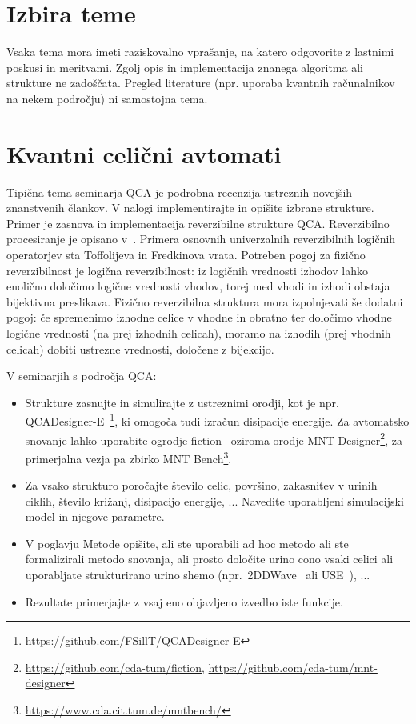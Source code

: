 \section*{Izbira teme}

Vsaka tema mora imeti raziskovalno vprašanje, na katero odgovorite z lastnimi poskusi in meritvami. Zgolj opis in implementacija znanega algoritma ali strukture ne zadoščata. Pregled literature (npr. uporaba kvantnih računalnikov na nekem področju) ni samostojna tema.

\section*{Kvantni celični avtomati}
\label{g00:sec:qca}

Tipična tema seminarja QCA je podrobna recenzija ustreznih novejših znanstvenih člankov. V nalogi implementirajte in opišite izbrane strukture. Primer je zasnova in implementacija reverzibilne strukture QCA. Reverzibilno procesiranje je opisano v~\cite{landauer1961, bennett1973, toffoli1980, frank2017}. Primera osnovnih univerzalnih reverzibilnih logičnih operatorjev sta Toffolijeva in Fredkinova vrata. Potreben pogoj za fizično reverzibilnost je logična reverzibilnost: iz logičnih vrednosti izhodov lahko enolično določimo logične vrednosti vhodov, torej med vhodi in izhodi obstaja bijektivna preslikava. Fizično reverzibilna struktura mora izpolnjevati še dodatni pogoj: če spremenimo izhodne celice v vhodne in obratno ter določimo vhodne logične vrednosti (na prej izhodnih celicah), moramo na izhodih (prej vhodnih celicah) dobiti ustrezne vrednosti, določene z bijekcijo.

V seminarjih s področja QCA:
\begin{itemize}
\item Strukture zasnujte in simulirajte z ustreznimi orodji, kot je npr. QCADesigner-E~\cite{walus2004, silltorres2018}\footnote{\url{https://github.com/FSillT/QCADesigner-E}}, ki omogoča tudi izračun disipacije energije. Za avtomatsko snovanje lahko uporabite ogrodje fiction~\cite{walter2019fiction} oziroma orodje MNT Designer\footnote{\url{https://github.com/cda-tum/fiction}, \url{https://github.com/cda-tum/mnt-designer}}, za primerjalna vezja pa zbirko MNT Bench\footnote{\url{https://www.cda.cit.tum.de/mntbench/}}.
\item Za vsako strukturo poročajte število celic, površino, zakasnitev v urinih ciklih, število križanj, disipacijo energije, ... Navedite uporabljeni simulacijski model in njegove parametre.
\item V poglavju Metode opišite, ali ste uporabili ad hoc metodo ali ste formalizirali metodo snovanja, ali prosto določite urino cono vsaki celici ali uporabljate strukturirano urino shemo (npr.\ 2DDWave~\cite{vankamamidi2008} ali USE~\cite{campos2016use}), ...
\item Rezultate primerjajte z vsaj eno objavljeno izvedbo iste funkcije.
\end{itemize}



